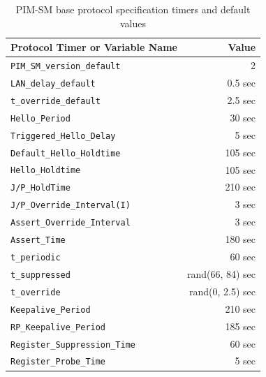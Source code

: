 \documentclass[11pt]{report}
\begin{document}
\begin{table}[h]
\begin{center}
\begin{tabular}{|l|r|}
\hline
Protocol Timer or Variable Name	& Value		\\
\hline
\hline
\verb=PIM_SM_version_default=	& 2		\\	%
\verb=LAN_delay_default=	& 0.5 sec	\\
\verb=t_override_default=	& 2.5 sec	\\
\verb=Hello_Period=		& 30 sec	\\
\verb=Triggered_Hello_Delay=	& 5 sec		\\
\verb=Default_Hello_Holdtime=	& 105 sec	\\
\verb=Hello_Holdtime=		& 105 sec	\\
\verb=J/P_HoldTime=		& 210 sec	\\
\verb=J/P_Override_Interval(I)=	& 3 sec		\\
\verb=Assert_Override_Interval=	& 3 sec		\\
\verb=Assert_Time=		& 180 sec	\\
\verb=t_periodic=		& 60 sec	\\
\verb=t_suppressed=		& rand(66, 84) sec \\
\verb=t_override=		& rand(0, 2.5) sec \\
\verb=Keepalive_Period=		& 210 sec	\\
\verb=RP_Keepalive_Period=	& 185 sec	\\
\verb=Register_Suppression_Time= & 60 sec	\\
\verb=Register_Probe_Time=	& 5 sec		\\
\hline
\end{tabular}
\caption{PIM-SM base protocol specification timers and default values}
\label{table:pim_sm_base_spec_values}
\end{center}
\end{table}

%
%
\newcommand{\PimsmBSPeriod}{60 sec}			%
\newcommand{\PimsmBSTimeout}{130 sec}			%
\newcommand{\PimsmRandOverride}{weighted\_rand(5.0, 23.0) sec} %
\newcommand{\PimsmCRPTimeout}{150 sec}			%
\newcommand{\PimsmCRPAdvPeriod}{60 sec}			%
\newcommand{\PimsmSZTimeout}{1300 sec}			%
\end{document}
